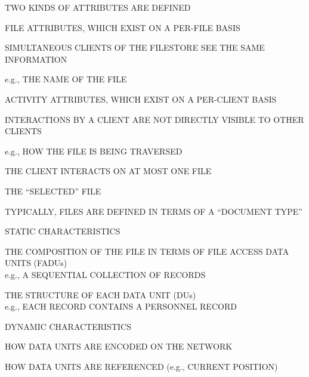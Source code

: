 \begin{bwslide}

\begin{nrtc}
\item	TWO KINDS OF ATTRIBUTES ARE DEFINED

\item	FILE ATTRIBUTES, WHICH EXIST ON A PER-FILE BASIS
    \begin{nrtc}
        \item	SIMULTANEOUS CLIENTS OF THE FILESTORE SEE THE SAME INFORMATION

	\item	e.g., THE NAME OF THE FILE
    \end{nrtc}

\item	ACTIVITY ATTRIBUTES, WHICH EXIST ON A PER-CLIENT BASIS
    \begin{nrtc}
    \item	INTERACTIONS BY A CLIENT ARE NOT DIRECTLY VISIBLE TO OTHER
		CLIENTS

    \item	e.g., HOW THE FILE IS BEING TRAVERSED
    \end{nrtc}

\item	THE CLIENT INTERACTS ON AT MOST ONE FILE
    \begin{nrtc}
    \item	THE ``SELECTED'' FILE
    \end{nrtc}
\end{nrtc}
\end{bwslide}


\begin{bwslide}

\begin{nrtc}
\item	TYPICALLY, FILES ARE DEFINED IN TERMS OF A ``DOCUMENT TYPE''

\item	STATIC CHARACTERISTICS
    \begin{nrtc}
    \item	THE COMPOSITION OF THE FILE IN TERMS OF FILE ACCESS DATA
		UNITS (FADUs)\\
		e.g., A SEQUENTIAL COLLECTION OF RECORDS

    \item	THE STRUCTURE OF EACH DATA UNIT (DUs)\\
		e.g., EACH RECORD CONTAINS A PERSONNEL RECORD
    \end{nrtc}

\item	DYNAMIC CHARACTERISTICS
    \begin{nrtc}
    \item	HOW DATA UNITS ARE ENCODED ON THE NETWORK

    \item	HOW DATA UNITS ARE REFERENCED (e.g., CURRENT POSITION)
    \end{nrtc}
\end{nrtc}
\end{bwslide}


